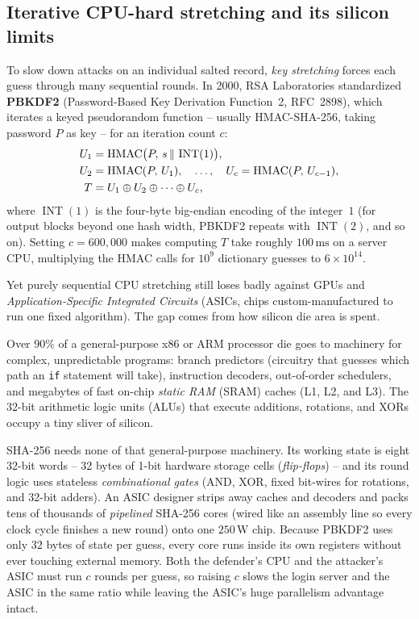 \subsection{Iterative CPU-hard stretching and its silicon limits}

To slow down attacks on an individual salted record, \emph{key stretching} forces each guess through many sequential rounds. In 2000, RSA Laboratories standardized \textbf{PBKDF2} (Password-Based Key Derivation Function~2, RFC~2898), which iterates a keyed pseudorandom function -- usually HMAC-SHA-256, taking password $P$ as key -- for an iteration count $c$:
\begin{align*}
  U_1 &= \operatorname{HMAC}\bigl(P,\, s \,\|\, \operatorname{INT}(1)\bigr), \\
  U_2 &= \operatorname{HMAC}(P,\, U_1), \quad \dots, \quad U_c = \operatorname{HMAC}(P,\, U_{c-1}), \\
  T   &= U_1 \oplus U_2 \oplus \cdots \oplus U_c,
\end{align*}
where $\operatorname{INT}(1)$ is the four-byte big-endian encoding of the integer~$1$ (for output blocks beyond one hash width, PBKDF2 repeats with $\operatorname{INT}(2)$, and so on). Setting $c = 600{,}000$ makes computing $T$ take roughly $100\,\text{ms}$ on a server CPU, multiplying the HMAC calls for $10^9$ dictionary guesses to $6 \times 10^{14}$.

Yet purely sequential CPU stretching still loses badly against GPUs and \emph{Application-Specific Integrated Circuits} (ASICs, chips custom-manufactured to run one fixed algorithm). The gap comes from how silicon die area is spent.

Over $90\%$ of a general-purpose x86 or ARM processor die goes to machinery for complex, unpredictable programs: branch predictors (circuitry that guesses which path an \texttt{if} statement will take), instruction decoders, out-of-order schedulers, and megabytes of fast on-chip \emph{static RAM} (SRAM) caches (L1, L2, and L3). The 32-bit arithmetic logic units (ALUs) that execute additions, rotations, and XORs occupy a tiny sliver of silicon.

SHA-256 needs none of that general-purpose machinery. Its working state is eight 32-bit words -- 32 bytes of 1-bit hardware storage cells (\emph{flip-flops}) -- and its round logic uses stateless \emph{combinational gates} (AND, XOR, fixed bit-wires for rotations, and 32-bit adders). An ASIC designer strips away caches and decoders and packs tens of thousands of \emph{pipelined} SHA-256 cores (wired like an assembly line so every clock cycle finishes a new round) onto one $250\,\text{W}$ chip. Because PBKDF2 uses only 32 bytes of state per guess, every core runs inside its own registers without ever touching external memory. Both the defender's CPU and the attacker's ASIC must run $c$ rounds per guess, so raising $c$ slows the login server and the ASIC in the same ratio while leaving the ASIC's huge parallelism advantage intact.

